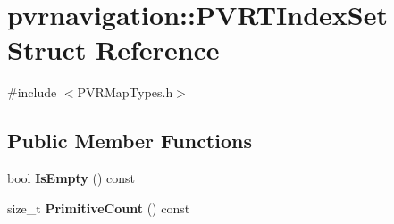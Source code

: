\hypertarget{structpvrnavigation_1_1_p_v_r_t_index_set}{\section{pvrnavigation\+:\+:P\+V\+R\+T\+Index\+Set Struct Reference}
\label{structpvrnavigation_1_1_p_v_r_t_index_set}
}


{\ttfamily \#include $<$P\+V\+R\+Map\+Types.\+h$>$}

\subsection*{Public Member Functions}
\begin{DoxyCompactItemize}
\item 
\hypertarget{structpvrnavigation_1_1_p_v_r_t_index_set_aeb4310cdf633f61b12739b422ae2fa8f}{bool {\bfseries Is\+Empty} () const }\label{structpvrnavigation_1_1_p_v_r_t_index_set_aeb4310cdf633f61b12739b422ae2fa8f}

\item 
\hypertarget{structpvrnavigation_1_1_p_v_r_t_index_set_adf16ebbed0b01a201ac6a1b57bda4c1f}{size\+\_\+t {\bfseries Primitive\+Count} () const }\label{structpvrnavigation_1_1_p_v_r_t_index_set_adf16ebbed0b01a201ac6a1b57bda4c1f}

\end{DoxyCompactItemize}
